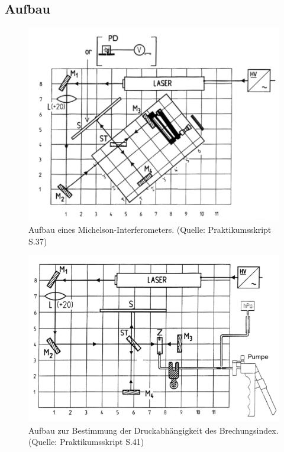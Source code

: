 \documentclass[12pt,a4paper]{article}
\begin{document}
\subsection{Aufbau}
\begin{figure}
\centering
\includegraphics[scale=0.6]{Bilder/Aufbau}
\caption{Aufbau eines Michelson-Interferometers. (Quelle: Praktikumsskript S.37)}
\label{fig:Aufbau}
\end{figure}

\begin{figure}
\begin{center}
\includegraphics[scale=0.6]{Bilder/AufbauDruck.png}
\caption{Aufbau zur Bestimmung der Druckabhängigkeit des Brechungsindex. (Quelle: Praktikumsskript S.41)}
\label{fig:AufbauDruck}
\end{center}
\end{figure}
\end{document}
